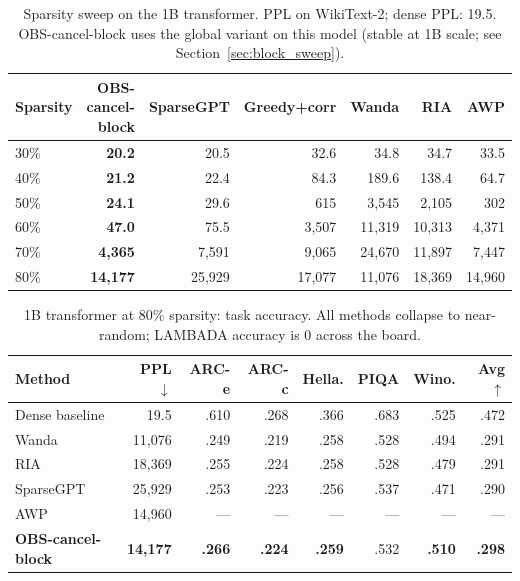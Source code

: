 \documentclass{article}
\begin{document}
\begin{table}[htbp]
  \centering
  \caption{%
    Sparsity sweep on the 1B transformer. PPL on WikiText-2; dense PPL: 19.5.
    OBS-cancel-block uses the global variant on this model
    (stable at 1B scale; see Section~\ref{sec:block_sweep}).
  }
  \label{tab:sweep_1b}
  \small
  \begin{tabular}{lrrrrrr}
    \toprule
    Sparsity & OBS-cancel-block & SparseGPT & Greedy+corr & Wanda & RIA & AWP \\
    \midrule
    30\% & \textbf{20.2}     & 20.5      & 32.6        & 34.8       & 34.7       & 33.5       \\
    40\% & \textbf{21.2}     & 22.4      & 84.3        & 189.6      & 138.4      & 64.7       \\
    50\% & \textbf{24.1}     & 29.6      & 615         & 3{,}545    & 2{,}105    & 302        \\
    60\% & \textbf{47.0}     & 75.5      & 3{,}507     & 11{,}319   & 10{,}313   & 4{,}371    \\
    70\% & \textbf{4{,}365}  & 7{,}591   & 9{,}065     & 24{,}670   & 11{,}897   & 7{,}447    \\
    80\% & \textbf{14{,}177} & 25{,}929  & 17{,}077    & 11{,}076   & 18{,}369   & 14{,}960   \\
    \bottomrule
  \end{tabular}
\end{table}

\begin{table}[htbp]
  \centering
  \caption{%
    1B transformer at 80\% sparsity: task accuracy.
    All methods collapse to near-random; LAMBADA accuracy is 0 across the board.
  }
  \label{tab:1b_80}
  \small
  \begin{tabular}{lrrrrrrr}
    \toprule
    Method & PPL$\downarrow$ & ARC-e & ARC-c & Hella. & PIQA & Wino. & Avg$\uparrow$ \\
    \midrule
    Dense baseline              & 19.5          & .610 & .268 & .366 & .683 & .525 & .472 \\
    \midrule
    Wanda                       & 11{,}076      & .249 & .219 & .258 & .528 & .494 & .291 \\
    RIA                         & 18{,}369      & .255 & .224 & .258 & .528 & .479 & .291 \\
    SparseGPT                   & 25{,}929      & .253 & .223 & .256 & .537 & .471 & .290 \\
    AWP                         & 14{,}960      & ---  & ---  & ---  & ---  & ---  & ---  \\
    \textbf{OBS-cancel-block}   & \textbf{14{,}177} & \textbf{.266} & \textbf{.224} & \textbf{.259} & .532 & \textbf{.510} & \textbf{.298} \\
    \bottomrule
  \end{tabular}
\end{table}
\end{document}
